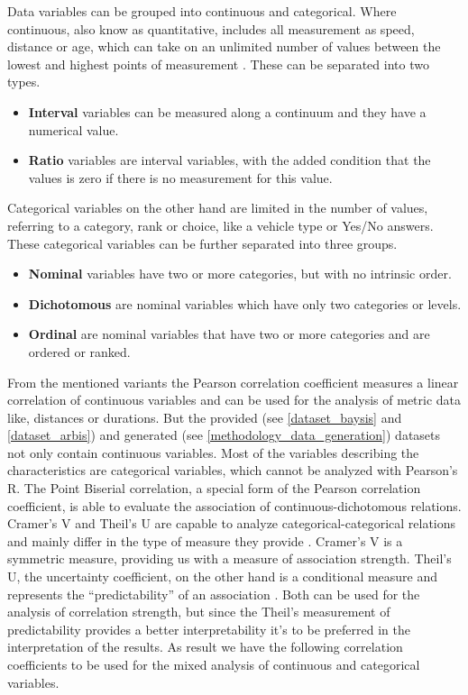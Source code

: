 \documentclass[a4paper,12pt]{report}
\begin{document}
Data variables can be grouped into continuous and categorical. Where continuous, also know as quantitative, includes all measurement as speed, distance or age, which can take on an unlimited number of values between the lowest and highest points of measurement \cite{McCue2007}. These can be separated into two types. 

\begin{itemize}
	\item \textbf{Interval} variables can be measured along a continuum and they have a numerical value. \cite{Laerd2020}
    \item \textbf{Ratio} variables are interval variables, with the added condition that the values is zero if there is no measurement for this value. \cite{Laerd2020}
\end{itemize}

Categorical variables on the other hand are limited in the number of values, referring to a category, rank or choice, like a vehicle type or Yes/No answers. These categorical variables can be further separated into three groups.

\begin{itemize}
	\item \textbf{Nominal} variables have two or more categories, but with no intrinsic order. \cite{Laerd2020}
	\item \textbf{Dichotomous} are nominal variables which have only two categories or levels. \cite{Laerd2020}
    \item \textbf{Ordinal} are nominal variables that have two or more categories and are ordered or ranked. \cite{Laerd2020}
\end{itemize}

From the mentioned variants the Pearson correlation coefficient measures a linear correlation of continuous variables and can be used for the analysis of metric data like, distances or durations. But the provided (see \ref{dataset_baysis} and \ref{dataset_arbis}) and generated (see \ref{methodology_data_generation}) datasets not only contain continuous variables. Most of the variables describing the characteristics are categorical variables, which cannot be analyzed with Pearson's R. The Point Biserial correlation, a special form of the Pearson correlation coefficient, is able to evaluate the association of continuous-dichotomous relations. Cramer’s V and Theil’s U are capable to analyze categorical-categorical relations and mainly differ in the type of measure they provide \cite{OutsideTwoStandardDeviations2018}. Cramer’s V is a symmetric measure, providing us with a measure of association strength. Theil’s U, the uncertainty coefficient, on the other hand is a conditional measure and represents the “predictability” of an association \cite{Akoglu2018,StackExchange2020}. Both can be used for the analysis of correlation strength, but since the Theil’s measurement of predictability provides a better interpretability it’s to be preferred in the interpretation of the results. As result we have the following correlation coefficients to be used for the mixed analysis of continuous and categorical variables.
\end{document}

